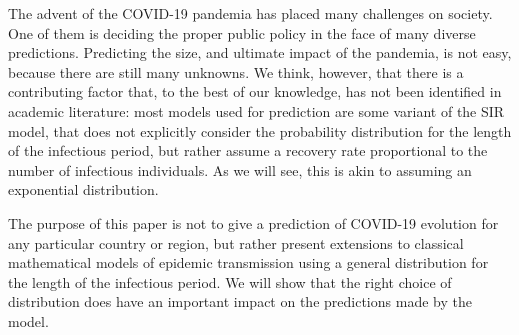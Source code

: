 \documentclass[USenglish,10pt]{article}
\begin{document}
The advent of the COVID-19 pandemia has placed many challenges on society.
One of them is deciding the proper public policy in the face of many diverse predictions.
Predicting the size, and ultimate impact of the pandemia, is not easy, because there are still many unknowns.
We think, however, that there is a contributing factor that, to the best of our knowledge, has not been identified in academic literature: most models used for prediction are some variant of the SIR model, that does not explicitly consider the probability distribution for the length of the infectious period, but rather assume a recovery rate proportional to the number of infectious individuals. As we will see, this is akin to assuming an exponential distribution.

The purpose of this paper is not to give a prediction of COVID-19 evolution for any particular country or region, but rather present extensions to classical mathematical models of epidemic transmission using a general distribution for the length of the infectious period. We will  show that the right choice of distribution does have an important impact on the predictions made by the model.
\end{document}
